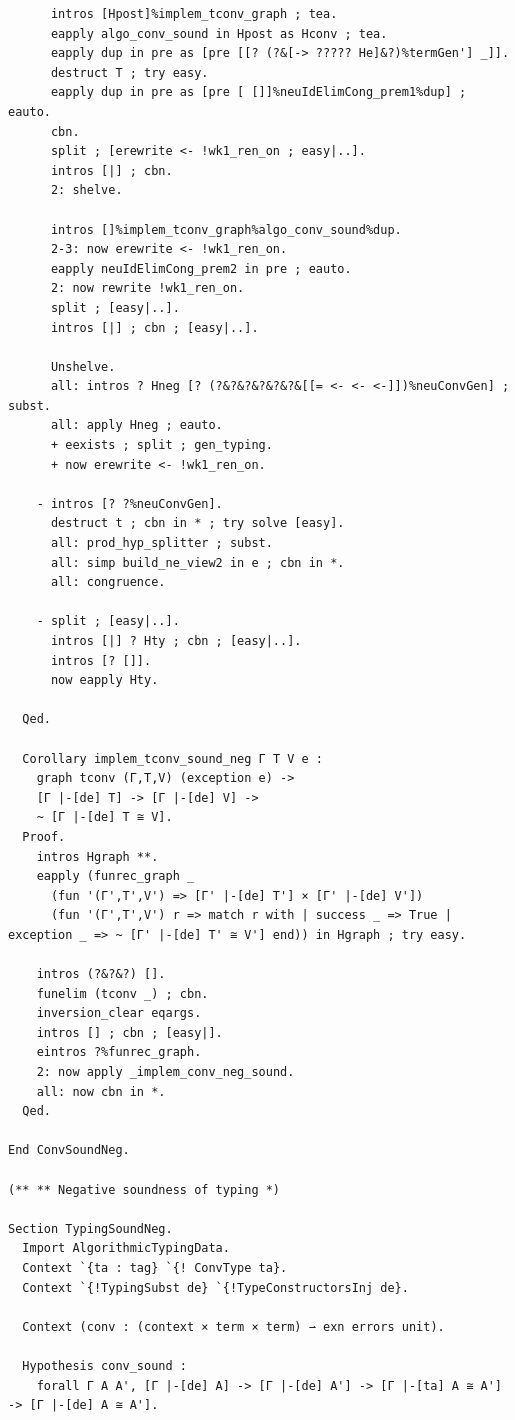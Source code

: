 \documentclass[10pt,a4paper]{amsart}
\begin{document}
\begin{lstlisting}
      intros [Hpost]%implem_tconv_graph ; tea.
      eapply algo_conv_sound in Hpost as Hconv ; tea.
      eapply dup in pre as [pre [[? (?&[-> ????? He]&?)%termGen'] _]].
      destruct T ; try easy.
      eapply dup in pre as [pre [ []]%neuIdElimCong_prem1%dup] ; eauto.
      cbn.
      split ; [erewrite <- !wk1_ren_on ; easy|..].
      intros [|] ; cbn.
      2: shelve.

      intros []%implem_tconv_graph%algo_conv_sound%dup.
      2-3: now erewrite <- !wk1_ren_on.
      eapply neuIdElimCong_prem2 in pre ; eauto.
      2: now rewrite !wk1_ren_on.
      split ; [easy|..].
      intros [|] ; cbn ; [easy|..].

      Unshelve.
      all: intros ? Hneg [? (?&?&?&?&?&?&[[= <- <- <-]])%neuConvGen] ; subst.
      all: apply Hneg ; eauto.
      + eexists ; split ; gen_typing.
      + now erewrite <- !wk1_ren_on. 

    - intros [? ?%neuConvGen].
      destruct t ; cbn in * ; try solve [easy].
      all: prod_hyp_splitter ; subst.
      all: simp build_ne_view2 in e ; cbn in *.
      all: congruence.
    
    - split ; [easy|..].
      intros [|] ? Hty ; cbn ; [easy|..].
      intros [? []].
      now eapply Hty.

  Qed.

  Corollary implem_tconv_sound_neg Γ T V e :
    graph tconv (Γ,T,V) (exception e) ->
    [Γ |-[de] T] -> [Γ |-[de] V] ->
    ~ [Γ |-[de] T ≅ V].
  Proof.
    intros Hgraph **.
    eapply (funrec_graph _
      (fun '(Γ',T',V') => [Γ' |-[de] T'] × [Γ' |-[de] V'])
      (fun '(Γ',T',V') r => match r with | success _ => True | exception _ => ~ [Γ' |-[de] T' ≅ V'] end)) in Hgraph ; try easy.
    
    intros (?&?&?) [].
    funelim (tconv _) ; cbn.
    inversion_clear eqargs.
    intros [] ; cbn ; [easy|].
    eintros ?%funrec_graph.
    2: now apply _implem_conv_neg_sound.
    all: now cbn in *.
  Qed.

End ConvSoundNeg.

(** ** Negative soundness of typing *)

Section TypingSoundNeg.
  Import AlgorithmicTypingData.
  Context `{ta : tag} `{! ConvType ta}.
  Context `{!TypingSubst de} `{!TypeConstructorsInj de}.

  Context (conv : (context × term × term) ⇀ exn errors unit).

  Hypothesis conv_sound :
    forall Γ A A', [Γ |-[de] A] -> [Γ |-[de] A'] -> [Γ |-[ta] A ≅ A'] -> [Γ |-[de] A ≅ A'].


\end{lstlisting}
\end{document}

